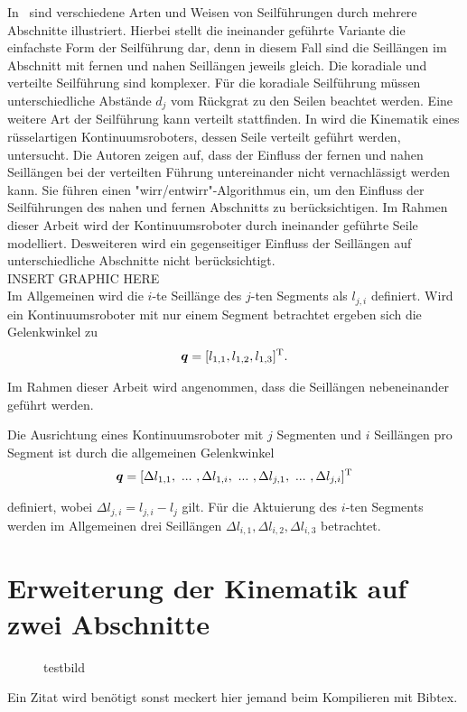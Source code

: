 In~ sind verschiedene Arten und Weisen von Seilführungen durch mehrere Abschnitte illustriert. Hierbei stellt die ineinander geführte Variante die einfachste Form der Seilführung dar, denn in diesem Fall sind die Seillängen im Abschnitt mit fernen und nahen Seillängen jeweils gleich. Die koradiale und verteilte Seilführung sind komplexer. Für die koradiale Seilführung müssen unterschiedliche Abstände $d_j$ vom Rückgrat zu den Seilen beachtet werden. Eine weitere Art der Seilführung kann verteilt stattfinden. In \cite{JW06a} wird die Kinematik eines rüsselartigen Kontinuumsroboters, dessen Seile verteilt geführt werden, untersucht. Die Autoren zeigen auf, dass der Einfluss der fernen und nahen Seillängen bei der verteilten Führung untereinander nicht vernachlässigt werden kann. Sie führen einen "wirr/entwirr"-Algorithmus ein, um den Einfluss der Seilführungen des nahen und fernen Abschnitts zu berücksichtigen. Im Rahmen dieser Arbeit wird der Kontinuumsroboter durch ineinander geführte Seile modelliert. Desweiteren wird ein gegenseitiger Einfluss der Seillängen auf unterschiedliche Abschnitte nicht berücksichtigt. \\

INSERT GRAPHIC HERE \\

Im Allgemeinen wird die $i$-te Seillänge des $j$-ten Segments als $l_{j,i}$ definiert. Wird ein Kontinuumsroboter mit nur einem Segment betrachtet ergeben sich die Gelenkwinkel zu
%
\begin{align*}
\bm{q} = [l_{1,1}, l_{1,2}, l_{1,3}]^{\mathrm{T}}.
\end{align*}



Im Rahmen dieser Arbeit wird angenommen, dass die Seillängen nebeneinander geführt werden. 


Die Ausrichtung eines Kontinuumsroboter mit $j$ Segmenten und $i$ Seillängen pro Segment ist durch die allgemeinen Gelenkwinkel
%
\begin{align*}
\bm{q} = [\Delta l_{1,1},~...~,\Delta l_{1,i},~...~,\Delta l_{j,1},~...~, \Delta l_{j,i} ]^{\mathrm{T}}
\end{align*}

definiert, wobei $\Delta l_{j,i} = l_{j,i}-l_j$ gilt. 
Für die Aktuierung des $i$-ten Segments werden im Allgemeinen drei Seillängen $\Delta l_{i,1}, \Delta l_{i,2}, \Delta l_{i,3}$ betrachtet. 


\section{Erweiterung der Kinematik auf zwei Abschnitte}
\label{sec:erweiterungKinematik}

\begin{figure}
\def\svgwidth{\linewidth}

\caption{testbild}
\end{figure}





\vspace{2cm} Ein Zitat wird benötigt sonst meckert hier jemand \cite{Li17} beim Kompilieren mit Bibtex.

